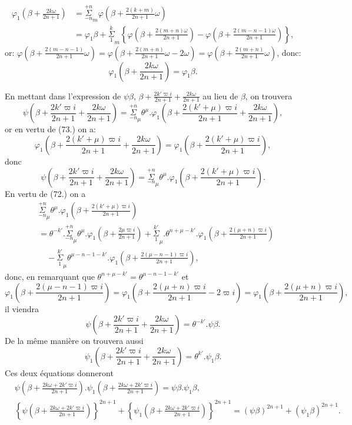 \documentclass{article}
\begin{document}
\[ \begin{aligned}
\varphi_{1}\left(\beta+\frac{2k\omega}{2n+1}\right)&=\overset{+n}{\underset{-n}{\Sigma}}_{m}\varphi\left(\beta+\frac{2(k+m)}{2n+1}\omega\right)\\
&=\varphi_{1}\beta+\overset{k}{\underset{1}{\Sigma}}_{m}\left\{\varphi\left(\beta+\frac{2(m+n)\omega}{2n+1}\right)-\varphi\left(\beta+\frac{2(m-n-1)\omega}{2n+1}\right)\right\},
\end{aligned} \]
or: $\varphi\left(\beta+\frac{2(m-n-1)}{2n+1}\omega\right)=\varphi\left(\beta+\frac{2(m+n)}{2n+1}\omega-2\omega\right)=\varphi\left(\beta+\frac{2(m+n)}{2n+1}\omega\right)$,
donc:
\[ \varphi_{1}\left(\beta+\frac{2k\omega}{2n+1}\right)=\varphi_{1}\beta. \tag{73.} \]

En mettant dans l'expression de $\psi\beta$, $\beta+\frac{2k'\varpi i}{2n+1}+\frac{2k\omega}{2n+1}$ au lieu de $\beta$, on trouvera
\[ \psi\left(\beta+\frac{2k'\varpi i}{2n+1}+\frac{2k\omega}{2n+1}\right)=\overset{+n}{\underset{-n}{\Sigma}}_{\mu}\theta^{\mu}.\varphi_{1}\left(\beta+\frac{2(k'+\mu)\varpi i}{2n+1}+\frac{2k\omega}{2n+1}\right), \]
or en vertu de (73.) on a:
\[ \varphi_{1}\left(\beta+\frac{2(k'+\mu)\varpi i}{2n+1}+\frac{2k\omega}{2n+1}\right)=\varphi_{1}\left(\beta+\frac{2(k'+\mu)\varpi i}{2n+1}\right), \]
donc
\[ \psi\left(\beta+\frac{2k'\varpi i}{2n+1}+\frac{2k\omega}{2n+1}\right)=\overset{+n}{\underset{-n}{\Sigma}}_{\mu}\theta^{\mu}.\varphi_{1}\left(\beta+\frac{2(k'+\mu)\varpi i}{2n+1}\right). \]
En vertu de (72.) on a
\[ \begin{aligned}
&\overset{+n}{\underset{-n}{\Sigma}}_{\mu}\theta^{\mu}.\varphi_{1}\left(\beta+\frac{2(k'+\mu)\varpi i}{2n+1}\right)\\
&=\theta^{-k'}.\overset{+n}{\underset{-n}{\Sigma}}_{\mu}\theta^{\mu}.\varphi_{1}\left(\beta+\frac{2\mu\varpi i}{2n+1}\right)+\overset{k'}{\underset{1}{\Sigma}}_{\mu}.\theta^{n+\mu-k'}.\varphi_{1}\left(\beta+\frac{2(\mu+n)\varpi i}{2n+1}\right)\\
&\quad-\overset{k'}{\underset{1}{\Sigma}}_{\mu}\theta^{\mu-n-1-k'}.\varphi_{1}\left(\beta+\frac{2(\mu-n-1)\varpi i}{2n+1}\right),
\end{aligned} \]
donc, en remarquant que $\theta^{n+\mu-k'}=\theta^{\mu-n-1-k'}$ et
\[ \varphi_{1}\left(\beta+\frac{2(\mu-n-1)\varpi i}{2n+1}\right)=\varphi_{1}\left(\beta+\frac{2(\mu+n)\varpi i}{2n+1}-2\varpi i\right)=\varphi_{1}\left(\beta+\frac{2(\mu+n)\varpi i}{2n+1}\right), \]
il viendra
\[ \psi\left(\beta+\frac{2k'\varpi i}{2n+1}+\frac{2k\omega}{2n+1}\right)=\theta^{-k'}.\psi\beta. \tag{74.} \]
De la même manière on trouvera aussi
\[ \psi_{1}\left(\beta+\frac{2k'\varpi i}{2n+1}+\frac{2k\omega}{2n+1}\right)=\theta^{k'}.\psi_{1}\beta. \]
Ces deux équations donneront
\[ \begin{aligned}
&\psi\left(\beta+\frac{2k\omega+2k'\varpi i}{2n+1}\right).\psi_{1}\left(\beta+\frac{2k\omega+2k'\varpi i}{2n+1}\right)=\psi\beta.\psi_{1}\beta,\\
&\left\{\psi\left(\beta+\frac{2k\omega+2k'\varpi i}{2n+1}\right)\right\}^{2n+1}+\left\{\psi_{1}\left(\beta+\frac{2k\omega+2k'\varpi i}{2n+1}\right)\right\}^{2n+1}=(\psi\beta)^{2n+1}+(\psi_{1}\beta)^{2n+1}.
\end{aligned} \]
\end{document}
